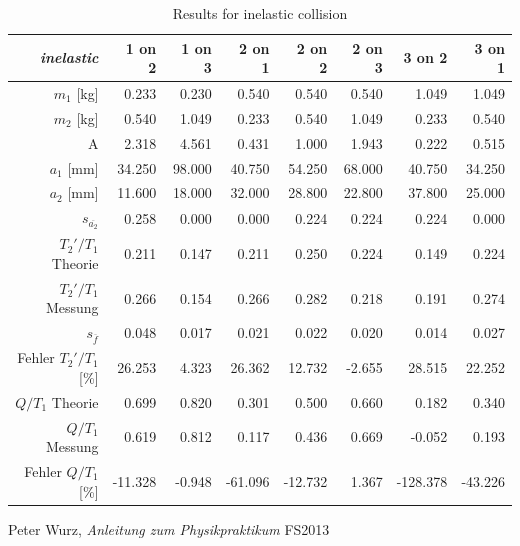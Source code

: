 \documentclass{scrreprt}
\renewcommand{\emph}[1]{\textit{#1}}
\begin{document}
\begin{table}[H]
\centering
\begin{tabular}{r||rrrrrrr}
 \emph{inelastic} &    1 on 2 &    1 on 3 &    2 on 1 &    2 on 2 &    2 on 3 &    3 on 2 &    3 on 1 \\\hline\hline
   $m_1$ [kg] &      0.233 &      0.230 &      0.540 &      0.540 &      0.540 &      1.049 &      1.049 \\
   $m_2$ [kg] &      0.540 &      1.049 &      0.233 &      0.540 &      1.049 &      0.233 &      0.540 \\
         A &      2.318 &      4.561 &      0.431 &      1.000 &      1.943 &      0.222 &      0.515 \\\hline
   $a_1$ [mm] &     34.250 &     98.000 &     40.750 &     54.250 &     68.000 &     40.750 &     34.250 \\
   $a_2$ [mm] &     11.600 &     18.000 &     32.000 &     28.800 &     22.800 &     37.800 &     25.000 \\
$s_{\overline{a_2}}$ &      0.258 &      0.000 &      0.000 &      0.224 &      0.224 &      0.224 &      0.000 \\\hline
$T_2'/T_1$ Theorie &      0.211 &      0.147 &      0.211 &      0.250 &      0.224 &      0.149 &      0.224 \\
$T_2'/T_1$ Messung &      0.266 &      0.154 &      0.266 &      0.282 &      0.218 &      0.191 &      0.274 \\
       $s_{\overline{f}}$  &      0.048 &      0.017 &      0.021 &      0.022 &      0.020 &      0.014 &      0.027 \\
Fehler $T_2'/T_1$ [\%]  &     26.253 &      4.323 &     26.362 &     12.732 &     -2.655 &     28.515 &     22.252 \\\hline

$Q/T_1$ Theorie &      0.699 &      0.820 &      0.301 &      0.500 &      0.660 &      0.182 &      0.340 \\
$Q/T_1$ Messung &      0.619 &      0.812 &      0.117 &      0.436 &      0.669 &     -0.052 &      0.193 \\
Fehler $Q/T_1$ [\%] &    -11.328 &     -0.948 &    -61.096 &    -12.732 &      1.367 &   -128.378 &    -43.226 \\
\end{tabular}  
\caption{Results for inelastic collision}
\label{tab:resultat2}
\end{table}
\begin{thebibliography}{9}

  Peter Wurz,
  \emph{Anleitung zum Physikpraktikum}
  FS2013

\end{thebibliography}
\end{document}

